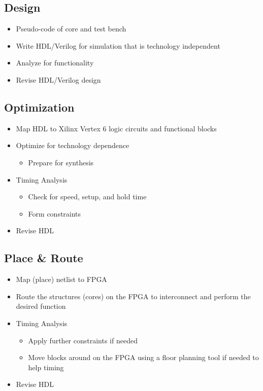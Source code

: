 \documentclass[a4paper]{report}   %
\begin{document}
\subsection{Design}
\begin{itemize}
  \item{Pseudo-code of core and test bench}
  \item{Write HDL/Verilog for simulation that is technology independent}
  \item{Analyze for functionality}
  \item{Revise HDL/Verilog design}
\end{itemize}

\subsection{Optimization}
\begin{itemize}
  \item{Map HDL to Xilinx Vertex 6 logic circuits and functional blocks}
  \item{Optimize for technology dependence}
    \begin{itemize}
      \item{Prepare for synthesis}
    \end{itemize}
  \item{Timing Analysis}
    \begin{itemize}
      \item{Check for speed, setup, and hold time}
      \item{Form constraints}
    \end{itemize}
  \item{Revise HDL}
\end{itemize}

\subsection{Place \& Route}
\begin{itemize}
  \item{Map (place) netlist to FPGA}
  \item{Route the structures (cores) on the FPGA to interconnect and perform the desired function}
  \item{Timing Analysis}
    \begin{itemize}
      \item{Apply further constraints if needed}
      \item{Move blocks around on the FPGA using a floor planning tool if needed to help timing}
    \end{itemize}
  \item{Revise HDL}
\end{itemize}
\end{document}
